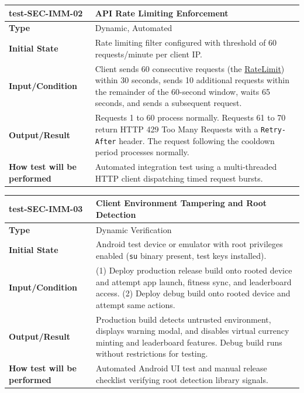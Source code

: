 \documentclass[12pt, titlepage]{article}
\newcommand{\const}[1]{\hyperlink{const:#1}{\textsf{#1}}}
\begin{document}
\vspace{1em}

\noindent\begin{tabularx}{\textwidth}{>{\raggedright\arraybackslash}p{3.5cm}X}
  \toprule
  \textbf{test-SEC-IMM-02} & \textbf{API Rate Limiting Enforcement}\\
  \midrule
  \textbf{Type} & Dynamic, Automated\\
  \textbf{Initial State} & Rate limiting filter configured with threshold of 60 requests/minute per client IP.\\
  \textbf{Input/Condition} & Client sends 60 consecutive requests (the \const{RateLimit}) within 30 seconds, sends 10 additional requests within the remainder of the 60-second window, waits 65 seconds, and sends a subsequent request.\\
  \textbf{Output/Result} & Requests 1 to 60 process normally. Requests 61 to 70 return HTTP 429 Too Many Requests with a \texttt{Retry-After} header. The request following the cooldown period processes normally.\\
  \textbf{How test will be performed} & Automated integration test using a multi-threaded HTTP client dispatching timed request bursts.\\
  \bottomrule
\end{tabularx}

\vspace{1em}

\noindent\begin{tabularx}{\textwidth}{>{\raggedright\arraybackslash}p{3.5cm}X}
  \toprule
  \textbf{test-SEC-IMM-03} & \textbf{Client Environment Tampering and Root Detection}\\
  \midrule
  \textbf{Type} & Dynamic Verification\\
  \textbf{Initial State} & Android test device or emulator with root privileges enabled (\texttt{su} binary present, test keys installed).\\
  \textbf{Input/Condition} & (1) Deploy production release build onto rooted device and attempt app launch, fitness sync, and leaderboard access. (2) Deploy debug build onto rooted device and attempt same actions.\\
  \textbf{Output/Result} & Production build detects untrusted environment, displays warning modal, and disables virtual currency minting and leaderboard features. Debug build runs without restrictions for testing.\\
  \textbf{How test will be performed} & Automated Android UI test and manual release checklist verifying root detection library signals.\\
  \bottomrule
\end{tabularx}
\end{document}

